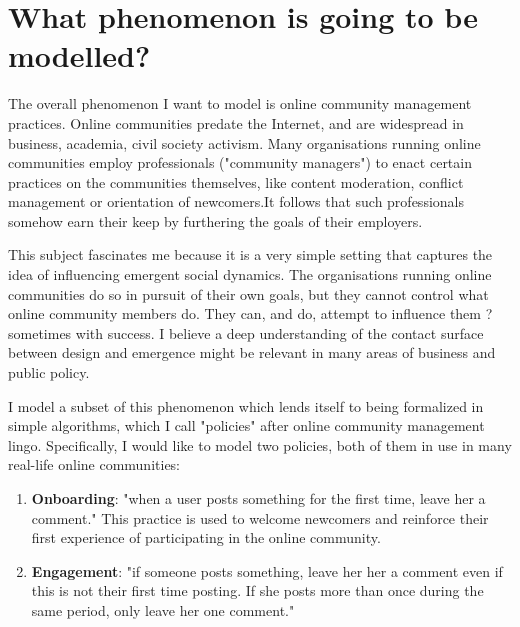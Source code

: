 \documentclass{article}
\begin{document}
\maketitle


\section{What phenomenon is going to be modelled?}

The overall phenomenon I want to model is online community management practices. Online communities predate the Internet, and are widespread in business, academia, civil society activism. Many organisations running online communities employ professionals ("community managers") to enact certain practices on the communities themselves, like content moderation, conflict management or orientation of newcomers.It follows that such professionals somehow earn their keep by furthering the goals of their employers. 

This subject fascinates me because it is a very simple setting that captures the idea of influencing emergent social dynamics. The organisations running online communities do so in pursuit of their own goals, but they cannot control what online community members do. They can, and do, attempt to influence them ? sometimes with success. I believe a deep understanding of the contact surface between design and emergence might be relevant in many areas of business and public policy. 

I model a subset of this phenomenon which lends itself to being formalized in simple algorithms, which I call "policies" after online community management lingo.
Specifically, I would like to model two policies, both of them in use in many real-life online communities: 

\begin{enumerate}
\item \textbf{Onboarding}: "when a user posts something for the first time, leave her a comment." This practice is used to welcome newcomers and reinforce their first experience of participating in the online community.
\item \textbf{Engagement}: "if someone posts something, leave her her a comment even if this is not their first time posting. If she posts more than once during the same period, only leave her one comment." 
\end{enumerate}
\end{document}
